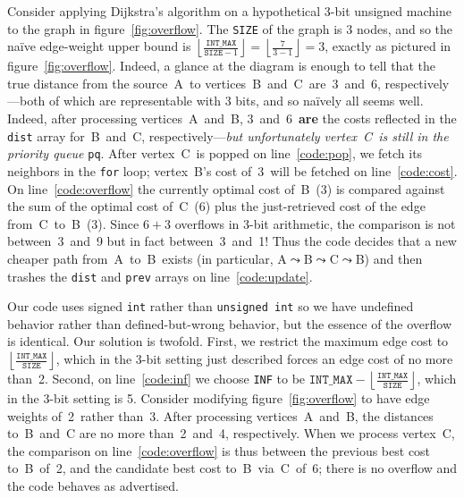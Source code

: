 Consider applying Dijkstra's algorithm on a hypothetical 3-bit unsigned machine to 
the graph in figure~\ref{fig:overflow}.  The \texttt{SIZE} of the graph is 3 nodes, and so the na\"ive edge-weight upper bound is $\left\lfloor\frac{\texttt{INT\_MAX}}{\texttt{SIZE}-1}\right\rfloor = \left\lfloor\frac{7}{3-1}\right\rfloor = 3$, exactly as pictured in figure~\ref{fig:overflow}.  Indeed, a glance at the diagram is enough to tell that the true distance from the source~A~to vertices~B~and~C~are~3~and~6, respectively---both of which are representable with 3 bits, and so na\"ively all seems well.  %
Indeed, after processing vertices~A~and~B, 3~and~6~\textbf{are} the costs reflected in the \texttt{dist} array for~B~and~C, respectively---\emph{but unfortunately vertex~C~is still in the priority queue} \texttt{pq}.  After vertex~C~is popped on line~\ref{code:pop}, we fetch its neighbors in the \texttt{for} loop; vertex~B's cost of~3~will be fetched on line~\ref{code:cost}.  On line~\ref{code:overflow} the currently optimal cost of~B~(3) is compared against the sum of the optimal cost of~C~(6) plus the just-retrieved cost of the edge from~C~to~B~(3).  Since $6+3$ overflows in 3-bit arithmetic, the comparison is not between~3~and~9 but in fact between~3~and~1!  Thus the code decides that a new cheaper path from~A~to~B~exists (in particular, A$\leadsto$B$\leadsto$C$\leadsto$B) and then trashes the \texttt{dist} and \texttt{prev} arrays on line~\ref{code:update}.  %

Our code uses signed \texttt{int} rather than \texttt{unsigned int} so we have undefined behavior rather than defined-but-wrong behavior, but the essence of the overflow is identical.
Our solution is twofold.  First, we restrict the maximum edge cost to $\left\lfloor\frac{\texttt{INT\_MAX}}{\texttt{SIZE}}\right\rfloor$, which in the 3-bit setting just described forces an edge cost of no more than~2.  Second, on line~\ref{code:inf} we choose \texttt{INF} to be $\texttt{INT\_MAX} - \left\lfloor \frac{\texttt{INT\_MAX}}{\texttt{SIZE}} \right\rfloor$, which in the 3-bit setting is 5.  Consider modifying figure~\ref{fig:overflow} to
have edge weights of~2~rather than~3.  After processing vertices~A~and~B, the distances to~B~and~C are no more than~2~and~4, respectively.  When we process vertex~C, the comparison on line~\ref{code:overflow} is thus between the previous best cost to~B~of~2, and the candidate best cost to~B~via~C~of~6; there is no overflow and the code behaves as advertised.

